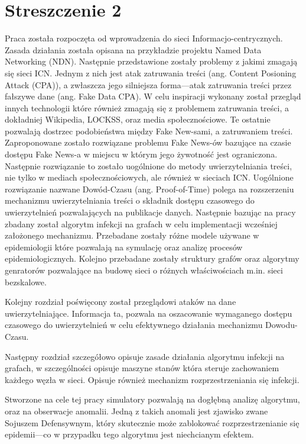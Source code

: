 \chapter*{Streszczenie 2}
Praca została rozpoczęta od wprowadzenia do sieci Informacjo-centrycznych. Zasada działania została opisana na przykładzie projektu Named Data Networking (NDN). Następnie przedstawione zostały problemy z jakimi zmagają się sieci ICN. Jednym z nich jest atak zatruwania treści (ang. Content Posioning Attack (CPA)), a zwłaszcza jego silniejsza forma––atak zatruwania treści przez fałszywe dane (ang. Fake Data CPA). W celu inspiracji wykonany został przegląd innych technologii które również zmagają się z problemem zatruwania treści, a dokładniej Wikipedia, LOCKSS, oraz media społecznościowe. Te ostatnie pozwalają dostrzec podobieństwa między Fake New-sami, a zatruwaniem treści. Zaproponowane zostało rozwiązane problemu Fake News-ów bazujące na czasie dostępu Fake News-a w miejscu w którym jego żywotność jest ograniczona. Następnie rozwiązanie to zostało uogólnione do metody uwierzytelniania treści, nie tylko w mediach społecznościowych, ale również w sieciach ICN. Uogólnione rozwiązanie nazwane Dowód-Czasu (ang. Proof-of-Time) polega na rozszerzeniu mechanizmu uwierzytelniania treści o składnik dostępu czasowego do uwierzytelnień pozwalających na publikacje danych.
Następnie bazując na pracy \cite{konorski2019mitigating} zbadany został algorytm infekcji na grafach w celu implementacji wcześniej założonego mechanizmu. Przebadane zostały różne modele używane w epidemiologii które pozwalają na symulację oraz analizę procesów epidemiologicznych.
Kolejno przebadane zostały struktury grafów oraz algorytmy genratorów pozwalające na budowę sieci o różnych właściwościach m.in. sieci bezskalowe. 

Kolejny rozdział poświęcony został przeglądowi ataków na dane uwierzytelniające. Informacja ta, pozwala na oszacowanie wymaganego dostępu czasowego do uwierzytelnień w celu efektywnego działania mechanizmu Dowodu-Czasu.

Następny rozdział szczegółowo opisuje zasade działania algorytmu infekcji na grafach, w szczególności opisuje maszyne stanów która steruje zachowaniem każdego węzła w sieci. Opisuje również mechanizm rozprzestrzeniania się infekcji.

Stworzone na cele tej pracy simulatory pozwalają na dogłębną analizę algorytmu, oraz na obserwacje anomalii. Jedną z takich anomali jest zjawisko zwane Sojuszem Defensywnym, który skutecznie może zablokować rozprzestrzenianie się epidemii––co w przypadku tego algorytmu jest niechcianym efektem. 

